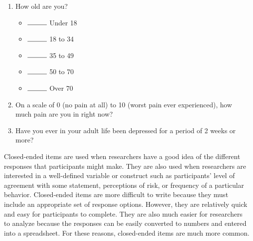 \begin{enumerate}

\item How old are you?

\begin{itemize}

\item $\rule{1cm}{0.15mm}$ Under 18

\item  $\rule{1cm}{0.15mm}$ 18 to 34

\item  $\rule{1cm}{0.15mm}$ 35 to 49

\item  $\rule{1cm}{0.15mm}$ 50 to 70

\item  $\rule{1cm}{0.15mm}$ Over 70

\end{itemize}


\item On a scale of 0 (no pain at all) to 10 (worst pain ever experienced), how much pain are you in right now? 


\item Have you ever in your adult life been depressed for a period of 2 weeks or more?

\end{enumerate}


Closed-ended items are used when researchers have a good idea of the different responses that participants might make. They are also used when researchers are interested in a well-defined variable or construct such as participants’ level of agreement with some statement, perceptions of risk, or frequency of a particular behavior. Closed-ended items are more difficult to write because they must include an appropriate set of response options. However, they are relatively quick and easy for participants to complete. They are also much easier for researchers to analyze because the responses can be easily converted to numbers and entered into a spreadsheet. For these reasons, closed-ended items are much more common.



